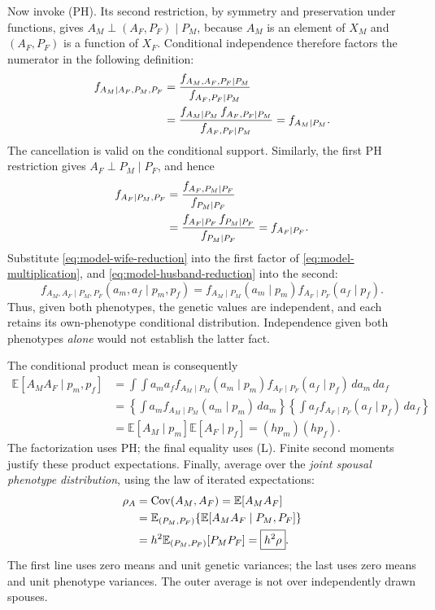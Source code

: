 Now invoke (PH). Its second restriction, by symmetry and preservation
under functions, gives $A_M\perp(A_F,P_F)\mid P_M$, because
$A_M$ is an element of $X_M$ and $(A_F,P_F)$ is a function of $X_F$.
Conditional independence therefore factors the numerator in the
following definition:
\begin{align}
 f_{A_M\mid A_F,P_M,P_F}
 &=\frac{f_{A_M,A_F,P_F\mid P_M}}{f_{A_F,P_F\mid P_M}}\notag\\
 &=\frac{f_{A_M\mid P_M}\,f_{A_F,P_F\mid P_M}}
         {f_{A_F,P_F\mid P_M}}
 =f_{A_M\mid P_M}.
 \label{eq:model-wife-reduction}
\end{align}
The cancellation is valid on the conditional support. Similarly, the
first PH restriction gives $A_F\perp P_M\mid P_F$, and hence
\begin{align}
 f_{A_F\mid P_M,P_F}
 &=\frac{f_{A_F,P_M\mid P_F}}{f_{P_M\mid P_F}}\notag\\
 &=\frac{f_{A_F\mid P_F}\,f_{P_M\mid P_F}}{f_{P_M\mid P_F}}
 =f_{A_F\mid P_F}.
 \label{eq:model-husband-reduction}
\end{align}
Substitute \eqref{eq:model-wife-reduction} into the first factor of
\eqref{eq:model-multiplication}, and
\eqref{eq:model-husband-reduction} into the second:
\begin{equation}
 f_{A_M,A_F\mid P_M,P_F}(a_m,a_f\mid p_m,p_f)
 =f_{A_M\mid P_M}(a_m\mid p_m)
  f_{A_F\mid P_F}(a_f\mid p_f).
 \label{eq:model-density-factor}
\end{equation}
Thus, given both phenotypes, the genetic values are independent, and
each retains its own-phenotype conditional distribution. Independence
given both phenotypes \emph{alone} would not establish the latter fact.

The conditional product mean is consequently
\begin{align*}
 \mathbb E[A_MA_F\mid p_m,p_f]
 &=\int\!\!\int a_ma_f
 f_{A_M\mid P_M}(a_m\mid p_m)
 f_{A_F\mid P_F}(a_f\mid p_f)\,da_m\,da_f\\
 &=\left\{\int a_m f_{A_M\mid P_M}(a_m\mid p_m)\,da_m\right\}
   \left\{\int a_f f_{A_F\mid P_F}(a_f\mid p_f)\,da_f\right\}\\
 &=\mathbb E[A_M\mid p_m]\mathbb E[A_F\mid p_f]
   =(hp_m)(hp_f).
\end{align*}
The factorization uses PH; the final equality uses (L).
Finite second moments justify these product expectations. Finally,
average over the \emph{joint spousal phenotype distribution}, using the
law of iterated expectations:
\begin{align}
 \rho_A
 &=\operatorname{Cov}(A_M,A_F)
   =\mathbb E[A_MA_F]\notag\\
 &=\mathbb E_{(P_M,P_F)}
       \{\mathbb E[A_MA_F\mid P_M,P_F]\}\notag\\
 &=h^2\mathbb E_{(P_M,P_F)}[P_MP_F]
   =\boxed{h^2\rho}.
 \label{eq:m-def}
\end{align}
The first line uses zero means and unit genetic variances; the last uses
zero means and unit phenotype variances. The outer average is not over
independently drawn spouses.

